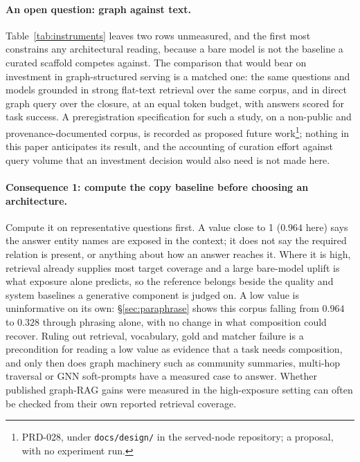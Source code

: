 \documentclass[10pt,twocolumn]{article}
\begin{document}
\paragraph{An open question: graph against text.} Table~\ref{tab:instruments} leaves two rows unmeasured, and the first most constrains any architectural reading, because a bare model is not the baseline a curated scaffold competes against. The comparison that would bear on investment in graph-structured serving is a matched one: the same questions and models grounded in strong flat-text retrieval over the same corpus, and in direct graph query over the closure, at an equal token budget, with answers scored for task success. A preregistration specification for such a study, on a non-public and provenance-documented corpus, is recorded as proposed future work\footnote{PRD-028, under \nolinkurl{docs/design/} in the served-node repository; a proposal, with no experiment run.}; nothing in this paper anticipates its result, and the accounting of curation effort against query volume that an investment decision would also need is not made here.

\paragraph{Consequence 1: compute the copy baseline before choosing an architecture.}
Compute it on representative questions first. A value close to 1 ($0.964$ here) says the answer entity names are exposed in the context; it does not say the required relation is present, or anything about how an answer reaches it. Where it is high, retrieval already supplies most target coverage and a large bare-model uplift is what exposure alone predicts, so the reference belongs beside the quality and system baselines a generative component is judged on. A low value is uninformative on its own: \S\ref{sec:paraphrase} shows this corpus falling from $0.964$ to $0.328$ through phrasing alone, with no change in what composition could recover. Ruling out retrieval, vocabulary, gold and matcher failure is a precondition for reading a low value as evidence that a task needs composition, and only then does graph machinery such as community summaries, multi-hop traversal or GNN soft-prompts have a measured case to answer. Whether published graph-RAG gains were measured in the high-exposure setting can often be checked from their own reported retrieval coverage.
\end{document}
